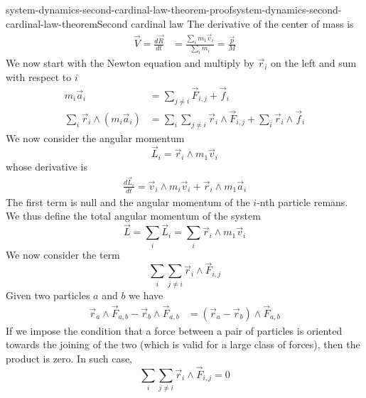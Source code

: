 \documentclass[preview]{standalone}
\begin{document}
\begin{snippetproof}{system-dynamics-second-cardinal-law-theorem-proof}{system-dynamics-second-cardinal-law-theorem}{Second cardinal law}
    The derivative of the center of mass is
    \begin{align*}
        \vec{V} = \frac{d\vec{R}}{dt} &= \frac{\sum_i m_1\vec{v}_i}{\sum_i m_i} = \frac{\vec{p}}{M}
    \end{align*}
    We now start with the Newton equation and multiply by \(\vec{r}_i\) on the left
    and sum with respect to \(i\)
    \begin{align*}
        m_i\vec{a}_i &= \sum_{j \neq i} \vec{F}_{i,j} + \vec{f}_{i} \\
        \sum_i \vec{r}_i \wedge (m_i\vec{a}_i) &= \sum_i \sum_{j \neq i} \vec{r}_i \wedge \vec{F}_{i,j} + \sum_i \vec{r}_i \wedge \vec{f}_{i}
    \end{align*}
    We now consider the angular momentum
    \[
        \vec{L}_i = \vec{r}_i \wedge m_1 \vec{v}_i
    \]
    whose derivative is
    \begin{align*}
        \frac{d\vec{L}_i}{dt} = \vec{v}_i \wedge m_i\vec{v}_i + \vec{r}_i \wedge m_1\vec{a}_i
    \end{align*}
    The first term is null and the angular momentum of the \(i\)-nth particle remans.
    We thus define the total angular momentum of the system
    \[
        \vec{L} = \sum_i \vec{L}_i = \sum_i \vec{r}_i \wedge m_1\vec{v}_i
    \]
    We now consider the term
    \[
        \sum_i \sum_{j\neq i} \vec{r}_i \wedge \vec{F}_{i,j}
    \]
    Given two particles \(a\) and \(b\) we have
    \begin{align*}
        \vec{r}_a \wedge \vec{F}_{a,b} - \vec{r}_b \wedge \vec{F}_{a,b}
        &= (\vec{r}_a - \vec{r}_b) \wedge \vec{F}_{a,b}
    \end{align*}
    If we impose the condition that a force between a pair of particles is oriented
    towards the joining of the two (which is valid for a large class of forces),
    then the product is zero.
    In such case,
    \[
        \sum_i \sum_{j\neq i} \vec{r}_i \wedge \vec{F}_{i,j} = 0
    \]
\end{snippetproof}
\end{document}
